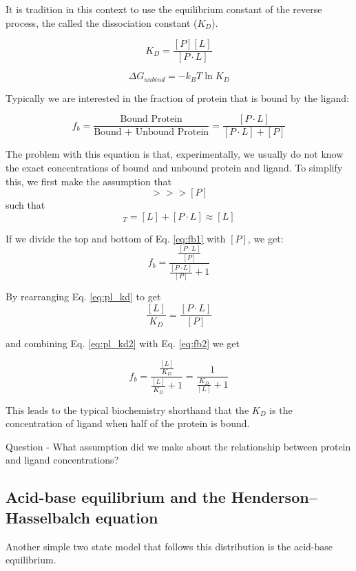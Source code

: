 It is tradition in this context to use the equilibrium constant of the reverse process, the called the dissociation constant ($K_D$).

\begin{equation}
    K_D = \frac{[P][L]}{[P \cdot L]}
    \label{eq:pl_kd}
\end{equation}

\begin{equation}
    \Delta G_{unbind} = - k_B T \ln {K_D}
\end{equation}

Typically we are interested in the fraction of protein that is bound by the ligand:

\begin{equation}
    f_b = \frac{\text{Bound Protein}}{\text{Bound + Unbound Protein}} = \frac{[P \cdot L]}{[P \cdot L] + [P]}
    \label{eq:fb1}
\end{equation}

The problem with this equation is that, experimentally, we usually do not know the exact concentrations of bound and unbound protein and ligand. 
To simplify this, we first make the assumption that
\begin{equation}
    [L] >>> [P]
\end{equation}
such that
\begin{equation}
    [L]_T = [L] + [P \cdot L] \approx [L]
\end{equation}

If we divide the top and bottom of Eq. \ref{eq:fb1} with $[P]$, we get:
\begin{equation}
    f_b = \frac{\frac{[P \cdot L]}{[P]}}{\frac{[P \cdot L]}{[P]} + 1}
    \label{eq:fb2}
\end{equation}

By rearranging Eq. \ref{eq:pl_kd} to get
\begin{equation}
    \frac{[L]}{K_D} = \frac{[P \cdot L]}{[P]}
    \label{eq:pl_kd2}
\end{equation}

and combining Eq. \ref{eq:pl_kd2} with Eq. \ref{eq:fb2} we get

\begin{equation}
    f_b = \frac{\frac{[L]}{K_D}}{\frac{[L]}{K_D} + 1} = \frac{1}{\frac{K_D}{[L]} + 1}
\end{equation}

This leads to the typical biochemistry shorthand that the $K_D$ is the concentration of ligand when half of the protein is bound. 

\begin{keynote}
Question - What assumption did we make about the relationship between protein and ligand concentrations?
\end{keynote}

\subsection{Acid-base equilibrium and the Henderson–Hasselbalch equation}

Another simple two state model that follows this distribution is the acid-base equilibrium.
